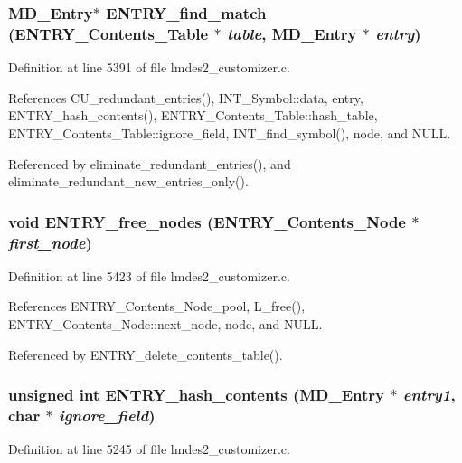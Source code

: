 \subsubsection{\setlength{\rightskip}{0pt plus 5cm}\bf{MD\_\-Entry}$\ast$ ENTRY\_\-find\_\-match (\bf{ENTRY\_\-Contents\_\-Table} $\ast$ {\em table}, \bf{MD\_\-Entry} $\ast$ {\em entry})}\label{lmdes2__customizer_8c_7b037f4ab90fd72816810e1990293073}




Definition at line 5391 of file lmdes2\_\-customizer.c.

References CU\_\-redundant\_\-entries(), INT\_\-Symbol::data, entry, ENTRY\_\-hash\_\-contents(), ENTRY\_\-Contents\_\-Table::hash\_\-table, ENTRY\_\-Contents\_\-Table::ignore\_\-field, INT\_\-find\_\-symbol(), node, and NULL.

Referenced by eliminate\_\-redundant\_\-entries(), and eliminate\_\-redundant\_\-new\_\-entries\_\-only().
\subsubsection{\setlength{\rightskip}{0pt plus 5cm}void ENTRY\_\-free\_\-nodes (\bf{ENTRY\_\-Contents\_\-Node} $\ast$ {\em first\_\-node})}\label{lmdes2__customizer_8c_9ce7b111a4ff0767a08abb0fd60b3ad3}




Definition at line 5423 of file lmdes2\_\-customizer.c.

References ENTRY\_\-Contents\_\-Node\_\-pool, L\_\-free(), ENTRY\_\-Contents\_\-Node::next\_\-node, node, and NULL.

Referenced by ENTRY\_\-delete\_\-contents\_\-table().
\subsubsection{\setlength{\rightskip}{0pt plus 5cm}unsigned int ENTRY\_\-hash\_\-contents (\bf{MD\_\-Entry} $\ast$ {\em entry1}, char $\ast$ {\em ignore\_\-field})}\label{lmdes2__customizer_8c_5111443c1c6b69caeee383c07d23fdc1}




Definition at line 5245 of file lmdes2\_\-customizer.c.

